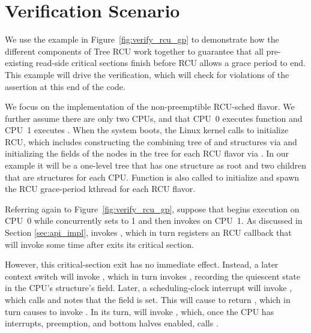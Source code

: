 \section{Verification Scenario}

We use the example in Figure~\ref{fig:verify_rcu_gp} to demonstrate how the
different components of Tree RCU work together to guarantee that all
pre-existing read-side critical sections finish before RCU allows a grace
period to end.  This example will drive the verification, which will check
for violations of the assertion at this end of the code.

We focus on the implementation of the non-preemptible RCU-sched flavor.  We
further assume there are only two CPUs, and that CPU~0 executes function
 and CPU~1 executes .  When the system
boots, the Linux kernel calls  to initialize RCU, which
includes constructing the combining tree of  and 
structures via  and initializing the fields of the
nodes in the tree for each RCU flavor via .  In our
example it will be a one-level tree that has one  structure as
root and two children that are  structures for each CPU. 
Function  is also called to initialize and spawn
the RCU grace-period kthread for each RCU flavor.

Referring again to Figure~\ref{fig:verify_rcu_gp},
suppose that  begins
execution on CPU~0 while  concurrently sets  to 1
and then invokes  on CPU~1.
As discussed in Section \ref{sec:api_impl}, 
invokes , which in turn registers an RCU callback
that will invoke  some time after 
exits its critical section.

However, this critical-section exit has no immediate effect.
Instead, a later context switch will invoke
, which in turn invokes
, recording the quiescent state in the
CPU's  structure's  field.
Later, a scheduling-clock interrupt will invoke
, which calls  and 
notes that the  field is set.
This will cause  to return , which
in turn causes  to invoke
.
In its turn,  will invoke
, which,
once the CPU has interrupts, preemption, and
bottom halves enabled, %
calls .

